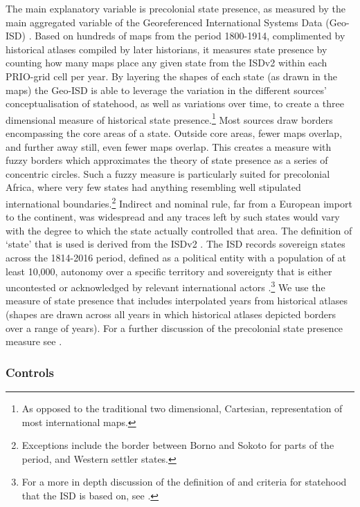 The main explanatory variable is precolonial state presence, as measured by the
main aggregated variable of the Georeferenced International Systems Data
(Geo-ISD) \citep{Wishman2021}. Based on hundreds of maps from the period
1800-1914, complimented by historical atlases compiled by later historians, it
measures state presence by counting how many maps place any given state from
the ISDv2 within each PRIO-grid cell per year. By layering the shapes of each
state (as drawn in the maps) the Geo-ISD is able to leverage the variation in
the different sources' conceptualisation of statehood, as well as variations
over time, to create a three dimensional measure of historical state
presence.\footnote{As opposed to the traditional two dimensional, Cartesian,
representation of most international maps.} Most sources draw borders
encompassing the core areas of a state. Outside core areas, fewer maps overlap,
and further away still, even fewer maps overlap. This creates a measure with
fuzzy borders which approximates the theory of state presence as a series of
concentric circles. Such a fuzzy measure is particularly suited for precolonial
Africa, where very few states had anything resembling well stipulated
international boundaries.\footnote{Exceptions include the border between Borno
and Sokoto for parts of the period, and Western settler states.} Indirect and
nominal rule, far from a European import to the continent, was widespread and
any traces left by such states would vary with the degree to which the state
actually controlled that area. The definition of `state' that is used is derived
from the ISDv2 \citep{Butcher2020}. The ISD records sovereign states across the
1814-2016 period, defined as a political entity with a population of at least
10,000, autonomy over a specific territory and sovereignty that is either
uncontested or acknowledged by relevant international actors
\citep{Butcher2020}.\footnote{For a more in depth discussion of the definition
of and criteria for statehood that the ISD is based on, see
\citet{Butcher2017}.} We use the measure of state presence that includes
interpolated years from historical atlases (shapes are drawn across all years in
which historical atlases depicted borders over a range of years). For a further
discussion of the precolonial state presence measure see \citet{Wishman2021}. 

\subsubsection{Controls} \label{Controls}

